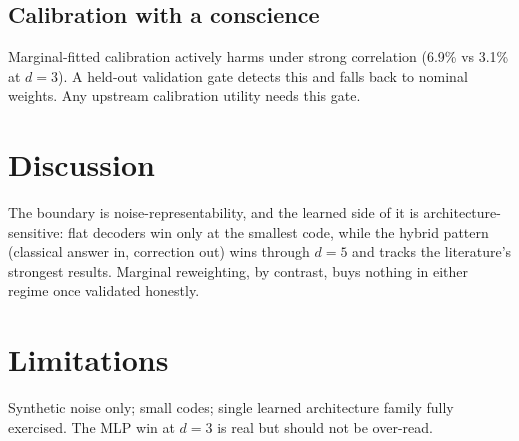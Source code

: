\documentclass[11pt]{article}
\begin{document}
\subsection{Calibration with a conscience}
Marginal-fitted calibration actively harms under strong correlation
(6.9\% vs 3.1\% at $d{=}3$). A held-out validation gate detects this
and falls back to nominal weights. Any upstream calibration utility
needs this gate.

\section{Discussion}
The boundary is noise-representability, and the learned side of it is
architecture-sensitive: flat decoders win only at the smallest code,
while the hybrid pattern (classical answer in, correction out) wins
through $d{=}5$ and tracks the literature's strongest results.
Marginal reweighting, by contrast, buys nothing in either regime once
validated honestly.

\section{Limitations}
Synthetic noise only; small codes; single learned architecture family
fully exercised. The MLP win at $d{=}3$ is real but should not be
over-read.

\end{document}
